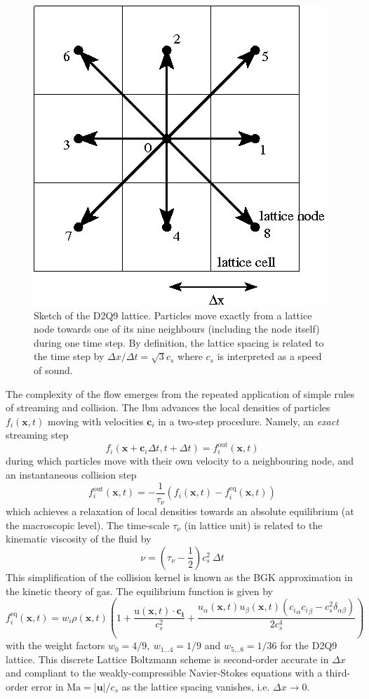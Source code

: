 \documentclass[pre,aps,floatfix,10pt,superscriptaddress, notitlepage,preprint]{revtex4-1}
\begin{document}
\begin{figure}
	\centering
	\includegraphics[width=0.3\linewidth]{D2Q9/D2Q9}
	\caption{Sketch of the D2Q9 lattice. Particles move exactly from a lattice node towards one of its nine neighbours (including the node itself) during one time step. By definition, the lattice spacing is related to the time step by $\Delta x/ \Delta t = \sqrt{3} c_s$ where $c_s$ is interpreted as a speed of sound.}
	\label{fig:D2Q9}
\end{figure}


%
The complexity of the flow emerges from the repeated application of simple rules of streaming and collision. The \ac{lbm} advances the local densities of particles $f_i(\mathbf{x},t)$ moving with velocities $\mathbf{c}_i$  in a two-step procedure. Namely, an \emph{exact} streaming step 
\[
f_i(\mathbf{x}+\mathbf{c}_i \Delta t, t + \Delta t) = f_i^{\mathrm{out}}(\mathbf{x},t)
\]
during which particles move with their own velocity to a neighbouring node, and an instantaneous collision step
\[
f_i^{\mathrm{out}}(\mathbf{x},t) = -\frac 1 {\tau_\nu} \left(f_i(\mathbf{x},t) - f_i^\mathrm{eq}(\mathbf{x},t) \right)
\]
which achieves a relaxation of local densities towards an absolute equilibrium (at the macroscopic level). The time-scale $\tau_\nu$ (in lattice unit) is related to the kinematic viscosity of the fluid by 
\[
\nu = \left( {\tau_\nu} - \frac 1 2 \right) c_s^2 ~\Delta t
\]
This simplification of the collision kernel is known as the BGK approximation in the kinetic theory of gas.
%
The equilibrium function is given by
\[
f_i^\mathrm{eq}(\mathbf{x},t) = w_i  \rho(\mathbf{x},t) \left( 1 + \frac{\mathrm u(\mathbf{x},t) \cdot \mathbf{c_i}}{c_s^2} +
\frac{u_\alpha(\mathbf{x},t) u_\beta(\mathbf{x},t)({c_i}_\alpha {c_i}_\beta - c_s^2 \delta_{\alpha\beta})}{2 c_s^4} \right)
\] 
with the weight factors $w_0=4/9,~w_{1...4} = 1/9$ and $w_{5...8}=1/36$ for the D2Q9 lattice. 
This discrete Lattice Boltzmann scheme is second-order accurate in $\Delta x $ and compliant to the weakly-compressible Navier-Stokes equations with a third-order error in $\mathrm{Ma}=|\mathbf{u}|/c_s$ as the lattice spacing vanishes, i.e. $\Delta x \to 0$. 
\end{document}
